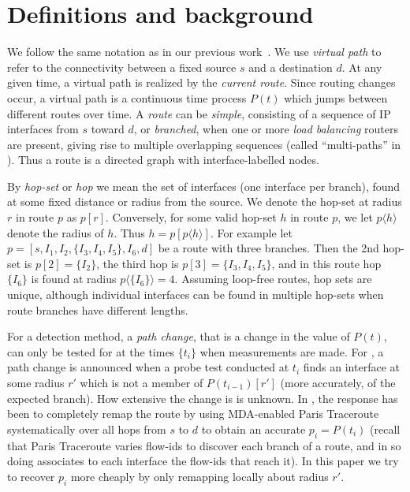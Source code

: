 \section{Definitions and background}
\label{sec:background}

\newcommand{\LCZ}{\ensuremath\mathrm{\textsc{lcz}}}

We follow the same notation as in our previous
work~\cite{cunha11dtrack}.  We use \emph{virtual path} to refer to the
connectivity between a fixed source $s$ and a destination $d$.  At any
given time, a virtual path is realized by the \emph{current route}.
Since routing changes occur, a virtual path is a continuous time process
$P(t)$ which jumps between different routes over time. A \emph{route}
can be \emph{simple}, consisting of a sequence of IP interfaces from $s$
toward $d$, or \emph{branched}, when one or more \emph{load balancing}
routers are present, giving rise to multiple overlapping sequences
(called ``multi-paths'' in \cite{veitch09balancer}).  Thus a route is a
directed graph with interface-labelled nodes.


By \emph{hop-set} or \emph{hop} we mean the set of interfaces (one
interface per branch), found at some fixed distance or radius from the
source.  We denote the hop-set at radius $r$ in route $p$ as $p[r]$.
Conversely, for some valid hop-set $h$ in route $p$, we let $p\langle
h\rangle$ denote the radius of $h$.  Thus $h=p[p\langle h\rangle]$.  For
example let $p =[s,I_1,I_2,\{I_3,I_4,I_5\},I_6,d]$ be a route with three
branches.  Then the 2nd hop-set is $p[2]=\{I_2\}$, the third hop is
$p[3]=\{I_3,I_4,I_5\}$, and in this route hop $\{I_6\}$ is found at
radius $p\langle \{I_6\}\rangle = 4$.  Assuming loop-free routes, hop
sets are unique, although individual interfaces can be found in multiple
hop-sets when route branches have different lengths.


For a detection method, a \emph{path change}, that is a change in the
value of $P(t)$, can only be tested for at the times $\{t_i\}$ when
measurements are made.  For  \dtrack{}, a path change is announced when
a probe test conducted at $t_i$ finds an interface at some radius $r'$
which is not a member of $P(t_{i-1})[r']$ (more accurately, of the
expected branch).  How extensive the change is is unknown. In \dtrack,
the response has been to completely remap the route by using MDA-enabled
Paris Traceroute systematically over all hops from $s$ to $d$ to obtain
an accurate $p_i = P(t_i)$ (recall that Paris Traceroute varies flow-ids
to discover each branch of a route, and in so doing associates to each
interface the flow-ids that reach it).  In this paper we try to recover
$p_i$ more cheaply by only remapping locally about radius $r'$.

